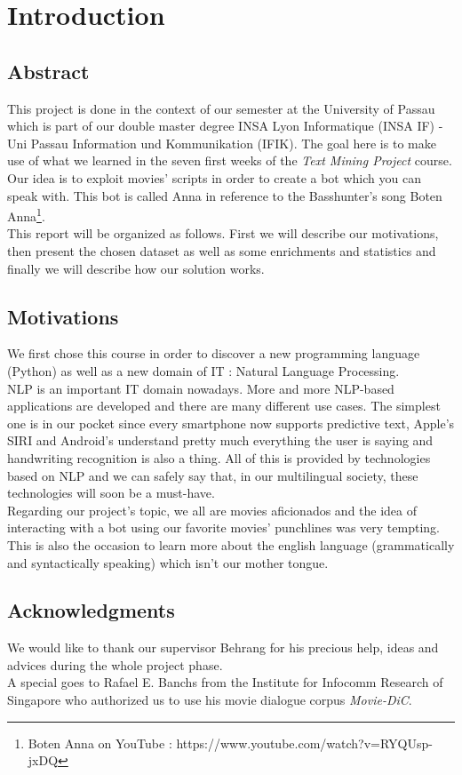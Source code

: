 \section{Introduction}
\subsection{Abstract}
This project is done in the context of our semester at the University of Passau which is part of our double master degree INSA Lyon Informatique (INSA IF) - Uni Passau Information und Kommunikation (IFIK).
The goal here is to make use of what we learned in the seven first weeks of the \textit{Text Mining Project} course.\\
Our idea is to exploit movies' scripts in order to create a bot which you can speak with. This bot is called Anna in reference to the Basshunter's song Boten Anna\footnote{Boten Anna on YouTube : https://www.youtube.com/watch?v=RYQUsp-jxDQ}. \\
This report will be organized as follows. First we will describe our motivations, then present the chosen dataset as well as some enrichments and statistics and finally we will describe how our solution works.
% 
\subsection{Motivations}
We first chose this course in order to discover a new programming language (Python) as well as a new domain of IT : Natural Language Processing.\\
NLP is an important IT domain nowadays. More and more NLP-based applications are developed and there are many different use cases. The simplest one is in our pocket since every smartphone now supports predictive text, Apple's SIRI and Android's  understand pretty much everything the user is saying and handwriting recognition is also a thing. All of this is provided by technologies based on NLP and we can safely say that, in our multilingual society, these technologies will soon be a must-have.\\
Regarding our project's topic, we all are movies aficionados and the idea of interacting with a bot using our favorite movies' punchlines was very tempting. This is also the occasion to learn more about the english language (grammatically and syntactically speaking) which isn't our mother tongue.

\subsection{Acknowledgments}
We would like to thank our supervisor Behrang for his precious help, ideas and advices during the whole project phase.\\
A special  goes to Rafael E. Banchs from the Institute for Infocomm Research of Singapore who authorized us to use his movie dialogue corpus \textit{Movie-DiC}.